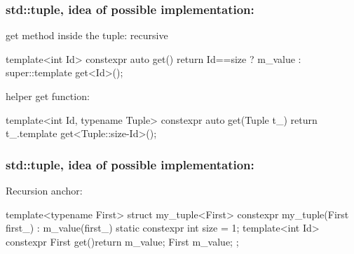 \documentclass[aspectratio=43]{beamer}
\begin{document}
\begin{frame}[fragile]\frametitle{std::tuple, idea of possible implementation:}

  get method inside the tuple:
  recursive
  \begin{Cpplisting}{}
template<int Id>
constexpr auto get(){
  return Id==size ?
         m_value :
         super::template get<Id>();
}
  \end{Cpplisting}
  helper get function:
  \begin{Cpplisting}{}
template<int Id, typename Tuple>
constexpr auto get(Tuple t_){
  return t_.template get<Tuple::size-Id>();
}
  \end{Cpplisting}
\end{frame}

\begin{frame}[fragile]\frametitle{std::tuple, idea of possible implementation:}

  Recursion anchor:
  \begin{Cpplisting}{}
template<typename First>
struct my_tuple<First> {
    constexpr my_tuple(First first_) : m_value(first_){}
    static constexpr int size = 1;
    template<int Id> constexpr First get(){return m_value;}
    First m_value;
};
  \end{Cpplisting}
\end{frame}

\end{document}
